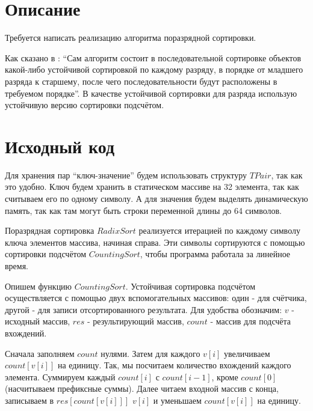 \section{Описание}
Требуется написать реализацию алгоритма поразрядной сортировки.

Как сказано в \cite{Kormen}: \enquote{Сам алгоритм состоит в последовательной сортировке объектов какой-либо 
устойчивой сортировкой по каждому разряду, в порядке от младшего разряда к старшему, после чего последовательности 
будут расположены в требуемом порядке}. В качестве устойчивой сортировки для разряда использую устойчивую версию 
сортировки подсчётом. 


\pagebreak

\section{Исходный код}

Для хранения пар \enquote{ключ-значение} будем использовать структуру $TPair$, так как это удобно. Ключ будем хранить
в статическом массиве на 32 элемента, так как считываем его по одному символу. А для значения будем выделять динамическую память, так как там могут быть строки переменной длины до 64 символов.

Поразрядная сортировка $RadixSort$ реализуется итерацией по каждому символу ключа элементов массива, начиная справа.
Эти символы сортируются с помощью сортировки подсчётом $CountingSort$, чтобы программа работала за линейное время.
 
Опишем функцию $CountingSort$. Устойчивая сортировка подсчётом осуществляется с помощью двух вспомогательных массивов: 
один - для счётчика, другой - для записи отсортированного результата. Для удобства обозначим: $v$ - исходный массив, 
$res$ - результирующий массив, $count$ - массив для подсчёта вхождений. 

Сначала заполняем $count$ нулями. Затем для каждого $v[i]$ увеличиваем $count[v[i]]$ на единицу. Так, мы посчитаем 
количество вхождений каждого элемента. Суммируем каждый $count[i]$ с $count[i - 1]$, кроме $count[0]$ (насчитываем 
префиксные суммы). 
Далее читаем входной массив с конца, записываем в $res[count[v[i]]]$ $v[i]$ и уменьшаем $count[v[i]]$ на единицу.



